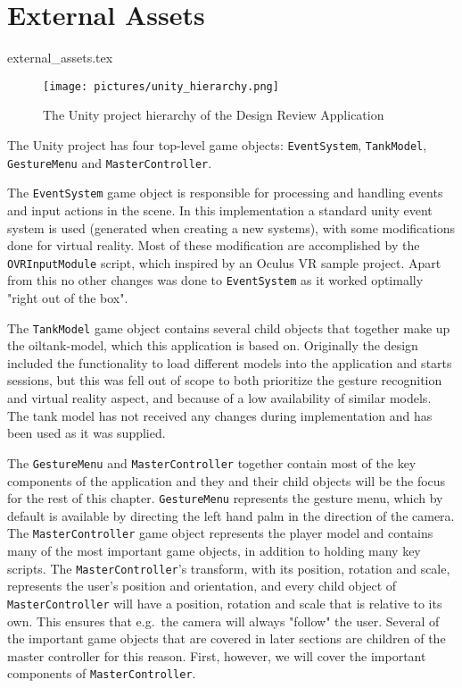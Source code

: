 
\section{External Assets}
\label{sec:external_assets}
{external_assets.tex}

\begin{figure}%
	\texttt{[image: pictures/unity\_hierarchy.png]} %
	\caption[The Unity project hierarchy of the Design Review Application]{The Unity project hierarchy of the Design Review Application}
	\label{fig:unity_hierarchy}
\end{figure} 

The Unity project has four top-level game objects: \texttt{EventSystem}, \texttt{TankModel}, \texttt{GestureMenu} and \texttt{MasterController}. 

The \texttt{EventSystem} game object is responsible for processing and handling events and input actions in the scene. 
In this implementation a standard unity event system is used (generated when creating a new systems), with some modifications done for virtual reality.
Most of these modification are accomplished by the \texttt{OVRInputModule} script, which inspired by an Oculus VR sample project. 
Apart from this no other changes was done to \texttt{EventSystem} as it worked optimally "right out of the box".

The \texttt{TankModel} game object contains several child objects that together make up the oiltank-model, which this application is based on.
Originally the design included the functionality to load different models into the application and starts sessions, but 
this was fell out of scope to both prioritize the gesture recognition and virtual reality aspect, and because of a low availability of similar models.
The tank model has not received any changes during implementation and has been used as it was supplied. 

The \texttt{GestureMenu} and \texttt{MasterController} together contain most of the key components of the application and they and their child objects will
be the focus for the rest of this chapter. \texttt{GestureMenu} represents the gesture menu, which by default is available by directing the left hand palm in the 
direction of the camera. The \texttt{MasterController} game object represents the player model and contains many of the most important game objects, in addition to
holding many key scripts. The \texttt{MasterController}'s transform, with its position, rotation and scale, represents the user's position and orientation, 
and every child object of \texttt{MasterController} will have a position, rotation and scale that is relative to its own. This ensures
that e.g.~the camera will always "follow" the user. Several of the important game objects that are covered in later sections are children of 
the master controller for this reason. First, however, we will cover the important components of \texttt{MasterController}.

